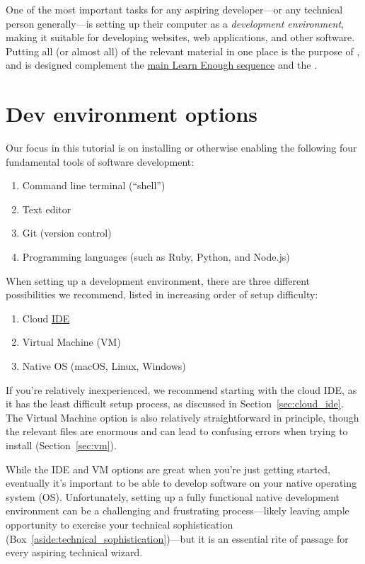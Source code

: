One of the most important tasks for any aspiring developer---or any technical person generally---is setting up their computer as a \emph{development environment}, making it suitable for developing websites, web applications, and other software. Putting all (or almost all) of the relevant material in one place is the purpose of \ledev, and is designed complement the \href{#}{main Learn Enough sequence} and the \rort.

\section{Dev environment options} %
\label{sec:dev_environment_options}

Our focus in this tutorial is on installing or otherwise enabling the following four fundamental tools of software development:

\begin{enumerate}
  \item Command line terminal (``shell'')
  \item Text editor
  \item Git (version control)
  \item Programming languages (such as Ruby, Python, and Node.js)
\end{enumerate}

When setting up a development environment, there are three different possibilities we recommend, listed in increasing order of setup difficulty:

\begin{enumerate}
  \item Cloud \href{https://en.wikipedia.org/wiki/Integrated_development_environment}{IDE}
  \item Virtual Machine (VM)
  \item Native OS (macOS, Linux, Windows)
\end{enumerate}

If you're relatively inexperienced, we recommend starting with the cloud IDE, as it has the least difficult setup process, as discussed in Section~\ref{sec:cloud_ide}. The Virtual Machine option is also relatively straightforward in principle, though the relevant files are enormous and can lead to confusing errors when trying to install (Section~\ref{sec:vm}).

While the IDE and VM options are great when you're just getting started, eventually it's important to be able to develop software on your native operating system (OS). Unfortunately, setting up a fully functional native development environment can be a challenging and frustrating process---likely leaving ample opportunity to exercise your technical sophistication (Box~\ref{aside:technical_sophistication})---but it is an essential rite of passage for every aspiring technical wizard.

